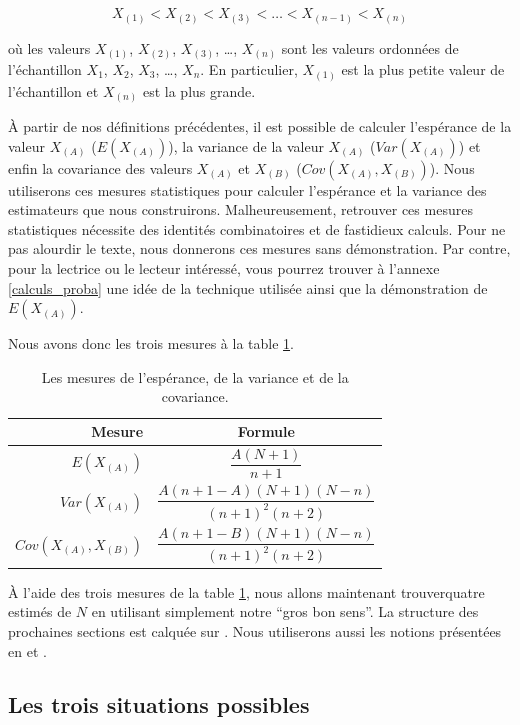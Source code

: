 \documentclass[10pt]{article}
\begin{document}
\[X_{(1)} <  X_{(2)} < X_{(3)} < \ldots < X_{(n-1)} < X_{(n)}\]

où les valeurs \(X_{(1)}\), \(X_{(2)}\), \(X_{(3)}\), \ldots{},
\(X_{(n)}\) sont les valeurs ordonnées de l'échantillon \(X_1\),
\(X_2\), \(X_3\), \ldots{}, \(X_n\). En particulier, \(X_{(1)}\) est la
plus petite valeur de l'échantillon et \(X_{(n)}\) est la plus grande.

À partir de nos définitions précédentes, il est possible de calculer
l'espérance de la valeur \(X_{(A)}\) (\(E(X_{(A)})\)), la variance de la
valeur \(X_{(A)}\) (\(Var(X_{(A)})\)) et enfin la covariance des valeurs
\(X_{(A)}\) et \(X_{(B)}\) (\(Cov(X_{(A)},X_{(B)})\)). Nous utiliserons
ces mesures statistiques pour calculer l'espérance et la variance des
estimateurs que nous construirons. Malheureusement, retrouver ces
mesures statistiques nécessite des identités combinatoires et de
fastidieux calculs. Pour ne pas alourdir le texte, nous donnerons ces
mesures sans démonstration. Par contre, pour la lectrice ou le lecteur
intéressé, vous pourrez trouver à l'annexe \ref{calculs_proba} une idée
de la technique utilisée ainsi que la démonstration de \(E(X_{(A)})\).

Nous avons donc les trois mesures à la table \ref{tab:mesures_stat}.

\begin{table}[ht]
\begin{center}
\begin{tabular}{|r|c|}
\hline
Mesure & Formule \\
\hline
\hline
$E(X_{(A)})$ & $\dfrac{A(N+1)}{n+1}$ \\ \hline
$Var(X_{(A)})$ & $\dfrac{A(n+1-A)(N+1)(N-n)}{(n+1)^2(n+2)}$ \\ \hline
$Cov(X_{(A)},X_{(B)})$ & $\dfrac{A(n+1-B)(N+1)(N-n)}{(n+1)^2(n+2)}$ \\ \hline
\end{tabular}
\end{center}
\caption{\label{tab:mesures_stat} {Les mesures de l'espérance, de la variance et de la covariance.} }
\end{table}

À l'aide des trois mesures de la table \ref{tab:mesures_stat}, nous
allons maintenant trouverquatre estimés de \(N\) en utilisant simplement
notre ``gros bon sens''. La structure des prochaines sections est
calquée sur \cite{Johnson}. Nous utiliserons aussi les notions
présentées en \cite{Goodman1952} et \cite{Goodman1954}.

\hypertarget{les-trois-situations-possibles}{%
\subsection{Les trois situations
possibles}\label{les-trois-situations-possibles}}
\end{document}

